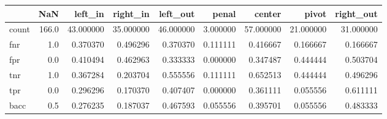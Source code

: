 \begin{tabular}{lrrrrrrrr}
\toprule
{} &    NaN &    left\_in &   right\_in &   left\_out &     penal &     center &      pivot &  right\_out \\
\midrule
count &  166.0 &  43.000000 &  35.000000 &  46.000000 &  3.000000 &  57.000000 &  21.000000 &  31.000000 \\
fnr   &    1.0 &   0.370370 &   0.496296 &   0.370370 &  0.111111 &   0.416667 &   0.166667 &   0.166667 \\
fpr   &    0.0 &   0.410494 &   0.462963 &   0.333333 &  0.000000 &   0.347487 &   0.444444 &   0.503704 \\
tnr   &    1.0 &   0.367284 &   0.203704 &   0.555556 &  0.111111 &   0.652513 &   0.444444 &   0.496296 \\
tpr   &    0.0 &   0.296296 &   0.170370 &   0.407407 &  0.000000 &   0.361111 &   0.055556 &   0.611111 \\
bacc  &    0.5 &   0.276235 &   0.187037 &   0.467593 &  0.055556 &   0.395701 &   0.055556 &   0.483333 \\
\bottomrule
\end{tabular}
